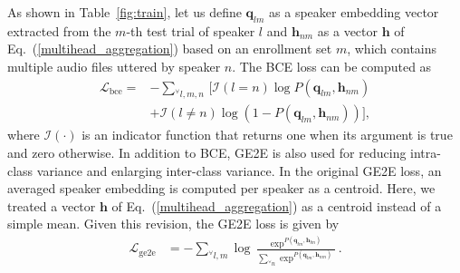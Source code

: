 \documentclass{article}
\begin{document}
As shown in Table~\ref{fig:train}, let us define $\boldsymbol{q}_{lm}$ as a speaker embedding vector extracted from the $m$-th test trial of speaker $l$ and $\boldsymbol{h}_{nm}$ as a vector $\boldsymbol{h}$ of Eq.\ (\ref{multihead_aggregation}) based on an enrollment set $m$, which contains multiple audio files uttered by speaker $n$. The BCE loss can be computed as  
\begin{align}
\label{bce}
\mathcal{L}_{\mathrm{bce}} = & - \sum_{^{\forall} l, m, n} \, [  \mathcal{I} \left( l=n \right) \log P ( \boldsymbol{q}_{lm},\boldsymbol{h}_{nm} ) \\ \nonumber
                           & +  \mathcal{I}\left( l \neq n \right) \log \left( 1-P \left(\boldsymbol{q}_{lm},\boldsymbol{h}_{nm}  \right) \right) ] ,
\end{align}
where $\mathcal{I}(\cdot)$ is an indicator function that returns one when its argument is true and zero otherwise. In addition to BCE, GE2E \cite{ge2e} is also used for reducing intra-class variance and enlarging inter-class variance. In the original GE2E loss, an averaged speaker embedding is computed per speaker as a centroid. Here, we treated a vector $\boldsymbol{h}$ of Eq.\ (\ref{multihead_aggregation}) as a centroid instead of a simple mean. Given this revision, the GE2E loss is given by
\begin{align}
\label{ge2e}
\mathcal{L}_{\mathrm{ge2e}} & = - \sum_{^{\forall} l, m} \log \frac{\exp^{P ( \boldsymbol{q}_{lm},\boldsymbol{h}_{lm} )}}{\sum_{^{\forall} n} \exp^{P ( \boldsymbol{q}_{lm},\boldsymbol{h}_{nm} )}}.
\end{align}
\vspace{-3mm}
\end{document}
